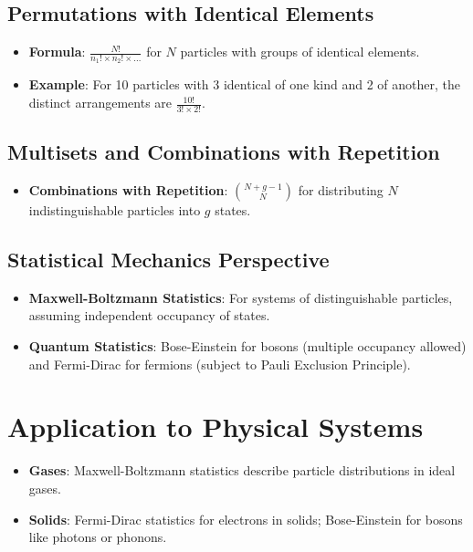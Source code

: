 \documentclass[12pt]{article}
\begin{document}
\subsection{Permutations with Identical Elements}
\begin{itemize}
    \item \textbf{Formula}: $\frac{N!}{n_1! \times n_2! \times \ldots}$ for $N$ particles with groups of identical elements.
    \item \textbf{Example}: For 10 particles with 3 identical of one kind and 2 of another, the distinct arrangements are $\frac{10!}{3! \times 2!}$.
\end{itemize}

\subsection{Multisets and Combinations with Repetition}
\begin{itemize}
    \item \textbf{Combinations with Repetition}: $\binom{N + g - 1}{N}$ for distributing $N$ indistinguishable particles into $g$ states.
\end{itemize}

\subsection{Statistical Mechanics Perspective}
\begin{itemize}
    \item \textbf{Maxwell-Boltzmann Statistics}: For systems of distinguishable particles, assuming independent occupancy of states.
    \item \textbf{Quantum Statistics}: Bose-Einstein for bosons (multiple occupancy allowed) and Fermi-Dirac for fermions (subject to Pauli Exclusion Principle).
\end{itemize}

\section{Application to Physical Systems}
\begin{itemize}
    \item \textbf{Gases}: Maxwell-Boltzmann statistics describe particle distributions in ideal gases.
    \item \textbf{Solids}: Fermi-Dirac statistics for electrons in solids; Bose-Einstein for bosons like photons or phonons.
\end{itemize}
\end{document}

